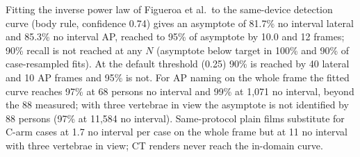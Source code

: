 Fitting the inverse power law of Figueroa et al.\ to the same-device detection curve (body rule, confidence 0.74) gives an asymptote of 81.7\% no interval lateral and 85.3\% no interval AP, reached to 95\% of asymptote by 10.0 and 12 frames; 90\% recall is not reached at any $N$ (asymptote below target in 100\% and 90\% of case-resampled fits). At the default threshold (0.25) 90\% is reached by 40 lateral and 10 AP frames and 95\% is not. 
For AP naming on the whole frame the fitted curve reaches 97\% at 68 persons no interval and 99\% at 1,071 no interval, beyond the 88 measured; with three vertebrae in view the asymptote is not identified by 88 persons (97\% at 11,584 no interval). 
Same-protocol plain films substitute for C-arm cases at 1.7 no interval per case on the whole frame but at 11 no interval with three vertebrae in view; CT renders never reach the in-domain curve.
